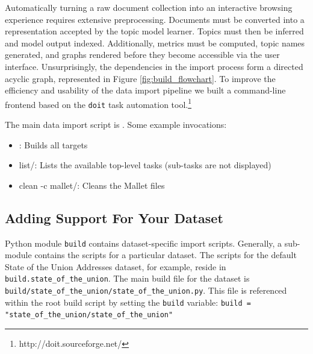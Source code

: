 \documentclass[11pt]{article}
\begin{document}
Automatically turning a raw document collection into an interactive browsing
experience requires extensive preprocessing. Documents must be converted into a
representation accepted by the topic model learner. Topics must then be inferred
and model output indexed. Additionally, metrics must be computed, topic names
generated, and graphs rendered before they become accessible via the user
interface. Unsurprisingly, the dependencies in the import process form a directed acyclic graph, represented in Figure \ref{fig:build_flowchart}. To
improve the efficiency and usability of the data import pipeline we built a
command-line frontend based on the \texttt{doit} task automation tool.\footnote{http://doit.sourceforge.net/}

The main data import script is \texttt{\buildscript}. Some example invocations:
\begin{itemize}
 \item \texttt{\buildscript}: Builds all targets
 \item \texttt{\buildscript} list/: Lists the available top-level tasks (sub-tasks are not displayed)
 \item \texttt{\buildscript} clean -c mallet/: Cleans the Mallet files
\end{itemize}


\subsection{Adding Support For Your Dataset}
Python module \texttt{build} contains dataset-specific import scripts.
Generally, a sub-module contains the scripts for a particular dataset. The
scripts for the default State of the Union Addresses dataset, for example,
reside in \texttt{build.state\_\allowbreak{}of\_\allowbreak{}the\_\allowbreak{}union}. The main build file for the dataset
is \texttt{build/\allowbreak{}state\_\allowbreak{}of\_\allowbreak{}the\_\allowbreak{}union/\allowbreak{}state\_\allowbreak{}of\_\allowbreak{}the\_\allowbreak{}union.py}. This file is
referenced within the root \texttt{\buildscript} build script by setting the
\texttt{build} variable:
\texttt{build = "state\_\allowbreak{}of\_\allowbreak{}the\_\allowbreak{}union/\allowbreak{}state\_\allowbreak{}of\_\allowbreak{}the\_\allowbreak{}union"}
\end{document}
